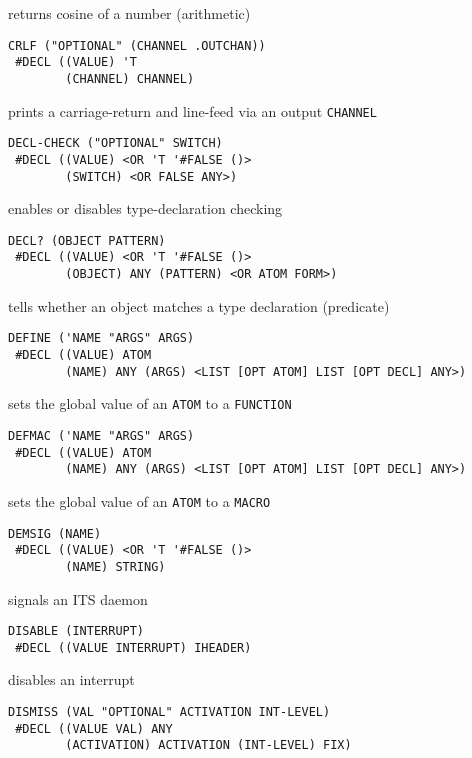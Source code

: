 \documentclass[a4paper]{scrbook}
\begin{document}
returns cosine of a number (arithmetic)

\begin{verbatim}
CRLF ("OPTIONAL" (CHANNEL .OUTCHAN))
 #DECL ((VALUE) 'T
        (CHANNEL) CHANNEL)
\end{verbatim}

prints a carriage-return and line-feed via an output \texttt{CHANNEL}

\begin{verbatim}
DECL-CHECK ("OPTIONAL" SWITCH)
 #DECL ((VALUE) <OR 'T '#FALSE ()>
        (SWITCH) <OR FALSE ANY>)
\end{verbatim}

enables or disables type-declaration checking

\begin{verbatim}
DECL? (OBJECT PATTERN)
 #DECL ((VALUE) <OR 'T '#FALSE ()>
        (OBJECT) ANY (PATTERN) <OR ATOM FORM>)
\end{verbatim}

tells whether an object matches a type declaration (predicate)

\begin{verbatim}
DEFINE ('NAME "ARGS" ARGS)
 #DECL ((VALUE) ATOM
        (NAME) ANY (ARGS) <LIST [OPT ATOM] LIST [OPT DECL] ANY>)
\end{verbatim}

sets the global value of an \texttt{ATOM} to a \texttt{FUNCTION}

\begin{verbatim}
DEFMAC ('NAME "ARGS" ARGS)
 #DECL ((VALUE) ATOM
        (NAME) ANY (ARGS) <LIST [OPT ATOM] LIST [OPT DECL] ANY>)
\end{verbatim}

sets the global value of an \texttt{ATOM} to a \texttt{MACRO}

\begin{verbatim}
DEMSIG (NAME)
 #DECL ((VALUE) <OR 'T '#FALSE ()>
        (NAME) STRING)
\end{verbatim}

signals an ITS daemon

\begin{verbatim}
DISABLE (INTERRUPT)
 #DECL ((VALUE INTERRUPT) IHEADER)
\end{verbatim}

disables an interrupt

\begin{verbatim}
DISMISS (VAL "OPTIONAL" ACTIVATION INT-LEVEL)
 #DECL ((VALUE VAL) ANY
        (ACTIVATION) ACTIVATION (INT-LEVEL) FIX)
\end{verbatim}
\end{document}
